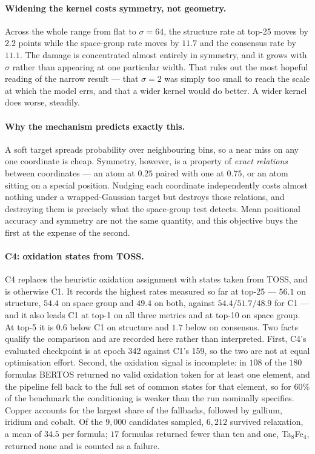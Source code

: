 \documentclass[manuscript,screen,review]{acmart}
\begin{document}
\paragraph{Widening the kernel costs symmetry, not geometry.}
Across the whole range from flat to $\sigma = 64$, the structure rate at top-25
moves by $2.2$ points while the space-group rate moves by $11.7$ and the
consensus rate by $11.1$. The damage is concentrated almost entirely in
symmetry, and it grows with $\sigma$ rather than appearing at one particular
width. That rules out the most hopeful reading of the narrow result --- that
$\sigma = 2$ was simply too small to reach the scale at which the model errs,
and that a wider kernel would do better. A wider kernel does worse, steadily.

\paragraph{Why the mechanism predicts exactly this.}
A soft target spreads probability over neighbouring bins, so a near miss on any
one coordinate is cheap. Symmetry, however, is a property of \emph{exact
relations} between coordinates --- an atom at $0.25$ paired with one at $0.75$,
or an atom sitting on a special position. Nudging each coordinate independently
costs almost nothing under a wrapped-Gaussian target but destroys those
relations, and destroying them is precisely what the space-group test detects.
Mean positional accuracy and symmetry are not the same quantity, and this
objective buys the first at the expense of the second.

\paragraph{C4: oxidation states from TOSS.}
C4 replaces the heuristic oxidation assignment with states taken from TOSS, and
is otherwise C1. It records the highest rates measured so far at top-25 ---
$56.1$ on structure, $54.4$ on space group and $49.4$ on both, against
$54.4 / 51.7 / 48.9$ for C1 --- and it also leads C1 at top-1 on all three
metrics and at top-10 on space group. At top-5 it is $0.6$ below C1 on structure
and $1.7$ below on consensus. Two facts qualify the comparison and are recorded
here rather than interpreted. First, C4's evaluated checkpoint is at epoch 342
against C1's 159, so the two are not at equal optimisation effort. Second, the
oxidation signal is incomplete: in $108$ of the $180$ formulas BERTOS returned
no valid oxidation token for at least one element, and the pipeline fell back to
the full set of common states for that element, so for $60\%$ of the benchmark
the conditioning is weaker than the run nominally specifies. Copper accounts for
the largest share of the fallbacks, followed by gallium, iridium and cobalt. Of
the $9{,}000$ candidates sampled, $6{,}212$ survived relaxation, a mean of
$34.5$ per formula; $17$ formulas returned fewer than ten and one, Ta$_8$Fe$_4$,
returned none and is counted as a failure.
\end{document}
